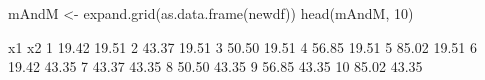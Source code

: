 \begin{Schunk}
\begin{Sinput}
 mAndM <- expand.grid(as.data.frame(newdf))
 head(mAndM, 10)
\end{Sinput}
\begin{Soutput}
      x1    x2
1  19.42 19.51
2  43.37 19.51
3  50.50 19.51
4  56.85 19.51
5  85.02 19.51
6  19.42 43.35
7  43.37 43.35
8  50.50 43.35
9  56.85 43.35
10 85.02 43.35
\end{Soutput}
\end{Schunk}
